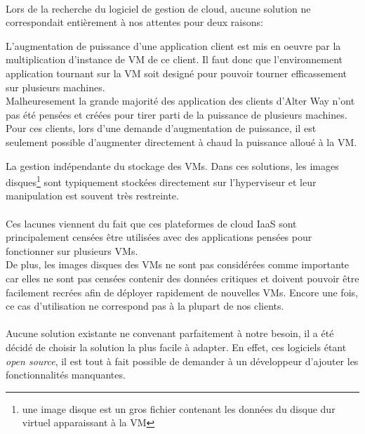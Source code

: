 \paragraph*{}
\label{cloudissues}
Lors de la recherche du logiciel de gestion de cloud, aucune solution ne correspondait entièrement à nos attentes pour deux raisons:
\begin{listi}
	\item L'augmentation de puissance d'une application client est mis en oeuvre par la multiplication d'instance de VM de ce client.
		Il faut donc que l'environnement application tournant sur la VM soit designé pour pouvoir tourner efficassement sur
		plusieurs machines.\\
		Malheuresement la grande majorité des application des clients d'Alter Way n'ont pas été pensées et créées pour tirer parti de la
		puissance de plusieurs machines.\\
		Pour ces clients, lors d'une demande d'augmentation de puissance, il est seulement possible d'augmenter directement à chaud
		la puissance alloué à la VM.

	\item La gestion indépendante du stockage des VMs. Dans ces solutions, les images disques\footnote{une image disque est un gros fichier contenant les données
	du disque dur virtuel apparaissant à la VM} sont typiquement stockées directement sur l'hyperviseur et leur manipulation est souvent très restreinte.
\end{listi}

\paragraph*{}
Ces lacunes viennent du fait que ces plateformes de cloud IaaS sont principalement censées être utilisées avec des applications pensées pour fonctionner sur plusieurs VMs. \\
De plus, les images disques des VMs ne sont pas considérées comme importante car elles ne sont pas censées contenir des données critiques et doivent pouvoir être facilement
recrées afin de déployer rapidement de nouvelles VMs. Encore une fois, ce cas d'utilisation ne correspond pas à la plupart de nos clients.

\paragraph*{}
Aucune solution existante ne convenant parfaitement à notre besoin, il a été décidé de choisir la solution la plus facile à adapter.
En effet, ces logiciels étant \emph{open source}, il est tout à fait possible de demander à un développeur d'ajouter les fonctionnalités manquantes.

